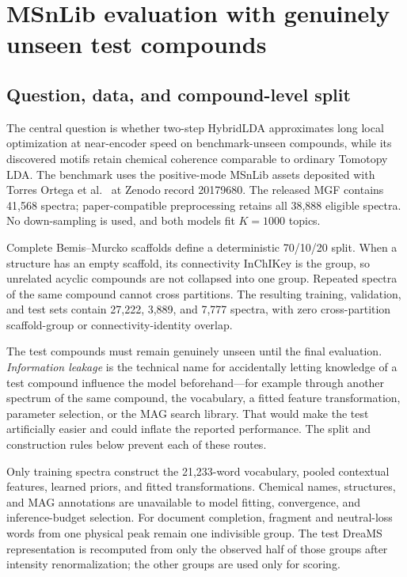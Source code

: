 \documentclass[11pt]{article}
\begin{document}
\section{MSnLib evaluation with genuinely unseen test compounds}

\subsection{Question, data, and compound-level split}

The central question is whether two-step HybridLDA approximates long local
optimization at near-encoder speed on benchmark-unseen compounds, while its
discovered motifs retain chemical coherence comparable to ordinary Tomotopy
LDA. The benchmark uses the positive-mode MSnLib assets deposited with Torres
Ortega et al.\ \cite{torres2026} at Zenodo record 20179680. The released MGF
contains 41,568 spectra; paper-compatible preprocessing retains all 38,888
eligible spectra. No down-sampling is used, and both models fit $K=1000$ topics.

Complete Bemis--Murcko scaffolds define a deterministic 70/10/20 split. When a
structure has an empty scaffold, its connectivity InChIKey is the group, so
unrelated acyclic compounds are not collapsed into one group. Repeated spectra
of the same compound cannot cross partitions. The resulting training,
validation, and test sets contain 27,222, 3,889, and 7,777 spectra, with zero
cross-partition scaffold-group or connectivity-identity overlap.

The test compounds must remain genuinely unseen until the final evaluation.
\emph{Information leakage} is the technical name for accidentally letting
knowledge of a test compound influence the model beforehand---for example
through another spectrum of the same compound, the vocabulary, a fitted
feature transformation, parameter selection, or the MAG search library. That
would make the test artificially easier and could inflate the reported
performance. The split and construction rules below prevent each of these
routes.

Only training spectra construct the 21,233-word vocabulary, pooled contextual
features, learned priors, and fitted transformations. Chemical names,
structures, and MAG annotations are unavailable to model fitting, convergence,
and inference-budget selection. For document completion, fragment and
neutral-loss words from one physical peak remain one indivisible group. The
test DreaMS representation is recomputed from only the observed half of those
groups after intensity renormalization; the other groups are used only for
scoring.
\end{document}
